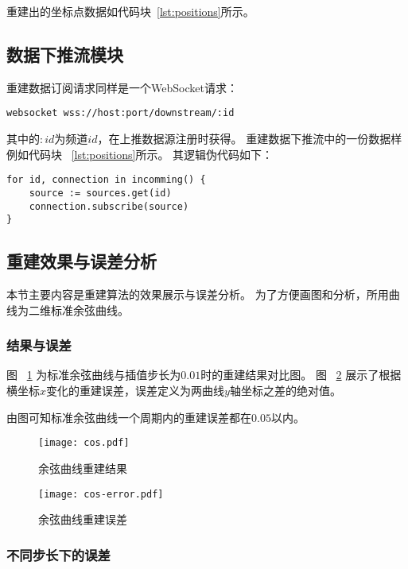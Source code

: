 重建出的坐标点数据如代码块~\ref{lst:positions}所示。

\subsection{数据下推流模块}

重建数据订阅请求同样是一个WebSocket请求：

\begin{lstlisting}[caption={重建数据订阅}]
websocket wss://host:port/downstream/:id
\end{lstlisting}

其中的$:id$为频道$id$，在上推数据源注册时获得。
重建数据下推流中的一份数据样例如代码块 ~\ref{lst:positions}所示。
其逻辑伪代码如下：

\begin{lstlisting}[caption={订阅数据源}]
for id, connection in incomming() {
    source := sources.get(id)
    connection.subscribe(source)
}
\end{lstlisting}

\subsection{重建效果与误差分析}

本节主要内容是重建算法的效果展示与误差分析。
为了方便画图和分析，所用曲线为二维标准余弦曲线。

\subsubsection{结果与误差}

图 ~\ref{fig:cos} 为标准余弦曲线与插值步长为$0.01$时的重建结果对比图。
图 ~\ref{fig:cos-error} 展示了根据横坐标$x$变化的重建误差，误差定义为两曲线$y$轴坐标之差的绝对值。

由图可知标准余弦曲线一个周期内的重建误差都在$0.05$以内。


\begin{figure}[H]
\centering
\texttt{[image: cos.pdf]}
\caption{余弦曲线重建结果}
\label{fig:cos}
\end{figure}

\begin{figure}[H]
\centering
\texttt{[image: cos-error.pdf]}
\caption{余弦曲线重建误差}
\label{fig:cos-error}
\end{figure}

\subsubsection{不同步长下的误差}

